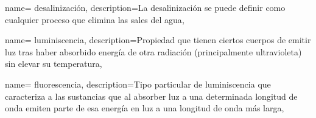{
	name= {desalinización},
	description={La desalinización se puede definir como cualquier proceso que elimina las sales del agua},
}

{
	name= {luminiscencia},
	description={Propiedad que tienen ciertos cuerpos de emitir luz tras haber absorbido energía de otra radiación (principalmente ultravioleta) sin elevar su temperatura},
}

{
	name= {fluorescencia},
	description={Tipo particular de \gls{luminiscencia} que caracteriza a las sustancias que al absorber luz a una determinada longitud de onda emiten parte de esa energía en luz a una longitud de onda más larga},
}